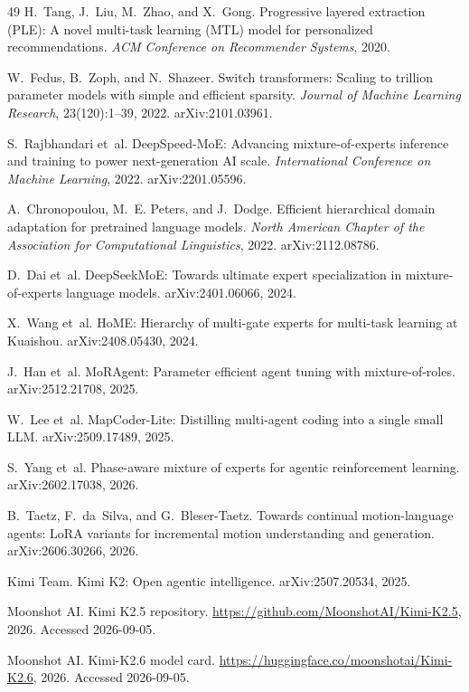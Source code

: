 \documentclass[10pt,a4paper]{article}
\begin{document}
\begin{thebibliography}{49}
H.~Tang, J.~Liu, M.~Zhao, and X.~Gong.
Progressive layered extraction (PLE): A novel multi-task learning (MTL) model
for personalized recommendations.
\emph{ACM Conference on Recommender Systems}, 2020.

W.~Fedus, B.~Zoph, and N.~Shazeer.
Switch transformers: Scaling to trillion parameter models with simple and
efficient sparsity.
\emph{Journal of Machine Learning Research}, 23(120):1--39, 2022.
arXiv:2101.03961.

S.~Rajbhandari et~al.
DeepSpeed-MoE: Advancing mixture-of-experts inference and training to power
next-generation AI scale.
\emph{International Conference on Machine Learning}, 2022.
arXiv:2201.05596.

A.~Chronopoulou, M.~E. Peters, and J.~Dodge.
Efficient hierarchical domain adaptation for pretrained language models.
\emph{North American Chapter of the Association for Computational
Linguistics}, 2022.
arXiv:2112.08786.

D.~Dai et~al.
DeepSeekMoE: Towards ultimate expert specialization in mixture-of-experts
language models.
arXiv:2401.06066, 2024.

X.~Wang et~al.
HoME: Hierarchy of multi-gate experts for multi-task learning at Kuaishou.
arXiv:2408.05430, 2024.

J.~Han et~al.
MoRAgent: Parameter efficient agent tuning with mixture-of-roles.
arXiv:2512.21708, 2025.

W.~Lee et~al.
MapCoder-Lite: Distilling multi-agent coding into a single small LLM.
arXiv:2509.17489, 2025.

S.~Yang et~al.
Phase-aware mixture of experts for agentic reinforcement learning.
arXiv:2602.17038, 2026.

B.~Taetz, F.~da~Silva, and G.~Bleser-Taetz.
Towards continual motion-language agents: LoRA variants for incremental
motion understanding and generation.
arXiv:2606.30266, 2026.

Kimi Team.
Kimi K2: Open agentic intelligence.
arXiv:2507.20534, 2025.

Moonshot AI.
Kimi K2.5 repository.
\url{https://github.com/MoonshotAI/Kimi-K2.5}, 2026. Accessed 2026-09-05.

Moonshot AI.
Kimi-K2.6 model card.
\url{https://huggingface.co/moonshotai/Kimi-K2.6}, 2026. Accessed 2026-09-05.


\end{thebibliography}
\end{document}
